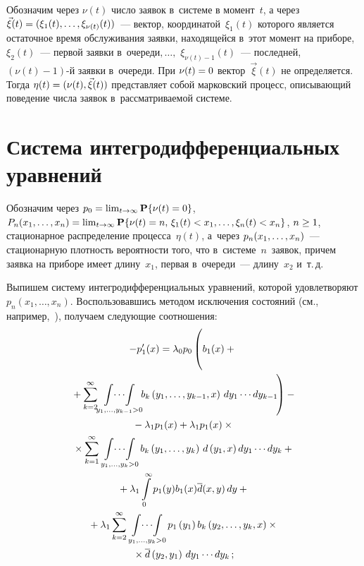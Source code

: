 \begin{multicols}{2}
\vspace*{-2pt}

Обозначим через $\nu(t)$ число заявок в~системе
в момент~$t$, а через $\vec\xi(t)\hm=
(\xi_{1}(t),\ldots,\xi_{\nu(t)}(t))$~---
вектор, координатой~$\xi_{1}(t)$ которого
является остаточное время обслуживания
заявки, находящейся в~этот момент на приборе,
$\xi_{2}(t)$~--- первой заявки в~очереди$,\ldots,$ $\xi_{\nu(t)-1}(t)$~---
последней, \mbox{$(\nu(t)-1)$-й} заявки в~очереди.
При $\nu(t)\hm=0$ вектор~$\vec\xi(t)$
не определяется.
Тогда $\eta(t)\hm=(\nu(t),\vec\xi(t))$ представляет
собой марковский процесс, описывающий
поведение числа заявок в~рассматриваемой системе.

\vspace*{-4pt}

\section{Система интегродифференциальных уравнений}

\vspace*{-2pt}

Обозначим через $p_{0}\hm=\lim\nolimits_{t\to\infty}
{\bf P}\{\nu(t)\hm=0\}$,
$P_{n}(x_1,\ldots,x_{n})
\hm= \lim\nolimits_{t\to\infty} {\bf P}\{\nu(t)\hm=n,\,
\xi_{1}(t)\hm<x_{1},\ldots,\xi_{n}(t)<x_{n}\}$, $n \hm\ge 1$,
стационарное распределение процесса~$\eta(t)$,
а~через $p_n(x_1,\ldots,x_n)$~---\linebreak стационарную плот\-ность
вероятности того, что в~сис\-те\-ме~$n$~заявок, причем заявка на приборе имеет
длину~$x_1$, первая в~очереди~--- длину~$x_2$ и~т.\,д.

Выпишем систему интегродифференциальных 
уравнений, которой удовлетворяют $p_n(x_1,\ldots,x_{n})$.
Воспользовавшись методом исключения со\-сто\-яний (см., например,~\cite{n1,n2,n3,n4,n5}),
получаем следующие соотношения:
\begin{multline}
\label{e1}
-p'_1(x) = \lambda_0 p_0 \left( 
\vphantom{\mathop{\int\!\cdots\!\int}\limits_{y_1,\ld,y_{k-1}>0}}
b_1(x) +{}\right.\\
\left.{}+
\sum\limits_{k=2}^\infty\!\!
\mathop{\int\!\cdots\!\int}\limits_{y_1,\ld,y_{k-1}>0}\!\!
b_k\left(y_1,\ld,y_{k-1},x\right)\, dy_1\cdots dy_{k-1}
\!\right)-{}\\
{}- \lambda_1 p_1(x) +
\lambda_1 p_1(x)\times{}\\
{}\times \sum\limits_{k=1}^\infty
\mathop{\int\!\cdots\!\int}\limits_{y_1,\ld,y_{k}>0}
b_k\left(y_1,\ld,y_{k}\right)\, d\left(y_1,x\right)  dy_1\cdots dy_{k}
+{}\\
{}+\lambda_1 \int\limits_0^\infty p_1(y) b_1(x) \d(x,y) \, dy
+{}\\
{}+
\lambda_1 \sum\limits_{k=2}^\infty
\mathop{\int\!\cdots\!\int}\limits_{y_1,\ld,y_{k}>0}
p_1\left(y_1\right)  b_k\left(y_2,\ld,y_{k},x\right) \times{}\\
{}\times\d\left(y_2,y_1\right)
\, dy_1\cdots dy_{k}\,;
\end{multline}


\end{multicols}
